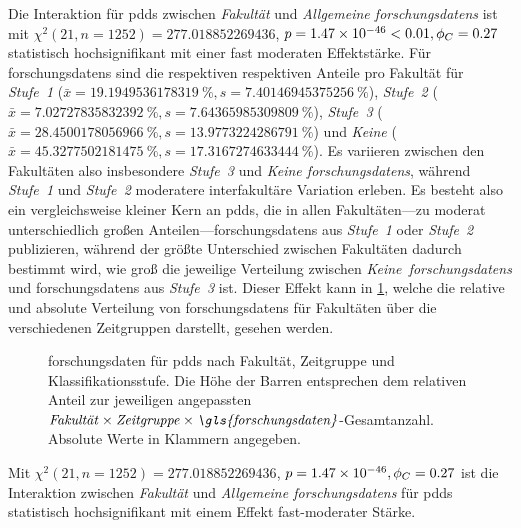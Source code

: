 Die Interaktion für \glspl{pdd} zwischen \textit{Fakultät} und \textit{Allgemeine \glspl{forschungsdaten}} ist mit $\chi^2 (\num{21}, n=\num{1252}) = \num[round-mode=places,round-precision=2]{277.018852269436}$, $p = \num[round-mode=places,round-precision=2]{1.46707274481795E-46}<\num{0.01},\phi_C=\num[round-mode=places,round-precision=2]{0.271576302422829}$ statistisch hochsignifikant mit einer fast moderaten Effektstärke.
Für \glspl{forschungsdaten} sind die respektiven respektiven Anteile pro Fakultät für \textit{Stufe~1} ($\bar{x}=\SI[round-mode=places,round-precision=2]{19.1949536178319}{\percent},s=\SI[round-mode=places,round-precision=2]{7.40146945375256}{\percent}$), \textit{Stufe~2} ($\bar{x}=\SI[round-mode=places,round-precision=2]{7.02727835832392}{\percent},s=\SI[round-mode=places,round-precision=2]{7.64365985309809}{\percent}$), \textit{Stufe~3} ($\bar{x}=\SI[round-mode=places,round-precision=2]{28.4500178056966}{\percent},s=\SI[round-mode=places,round-precision=2]{13.9773224286791}{\percent}$) und \textit{Keine} ($\bar{x}=\SI[round-mode=places,round-precision=2]{45.3277502181475}{\percent},s=\SI[round-mode=places,round-precision=2]{17.3167274633444}{\percent}$).
Es variieren zwischen den Fakultäten also insbesondere \textit{Stufe~3} und \textit{Keine \glspl{forschungsdaten}}, während \textit{Stufe~1} und \textit{Stufe~2} moderatere interfakultäre Variation erleben.
Es besteht also ein vergleichsweise kleiner Kern an \glspl{pdd}, die in allen Fakultäten---zu moderat unterschiedlich großen Anteilen---\glspl{forschungsdaten} aus \textit{Stufe~1} oder \textit{Stufe~2} publizieren, während der größte Unterschied zwischen Fakultäten dadurch bestimmt wird, wie groß die jeweilige Verteilung zwischen \textit{Keine~\glspl{forschungsdaten}} und \glspl{forschungsdaten} aus \textit{Stufe~3} ist.
Dieser Effekt kann in \cref{fig:luh-repo_fakultät_x_zeitgruppe_x_fd}, welche die relative und absolute Verteilung von \glspl{forschungsdaten} für Fakultäten über die verschiedenen Zeitgruppen darstellt, gesehen werden.
\begin{figure}[!htbp]
    \resizebox{\ifdim\width>\textwidth\textwidth\else\width\fi}{!}{}
    \caption{\gls{forschungsdaten} für \glspl{pdd} nach Fakultät, Zeitgruppe und Klassifikationsstufe.
    Die Höhe der Barren entsprechen dem relativen Anteil zur jeweiligen angepassten $\text{\textit{Fakultät}}\times\text{\textit{Zeitgruppe}}\times\text{\textit{\gls{forschungsdaten}}}$-Gesamtanzahl.
    Absolute Werte in Klammern angegeben.}
    \label{fig:luh-repo_fakultät_x_zeitgruppe_x_fd}
\end{figure}
Mit $\chi^2 (\num{21}, n=\num{1252}) = \num[round-mode=places,round-precision=2]{277.018852269436}$, $p = \num[round-mode=places,round-precision=2]{1.46707274481795E-46},\phi_C=\num[round-mode=places,round-precision=2]{0.271576302422829}$ ist die Interaktion zwischen \textit{Fakultät} und \textit{Allgemeine \glspl{forschungsdaten}} für \glspl{pdd} statistisch hochsignifikant mit einem Effekt fast-moderater Stärke.

